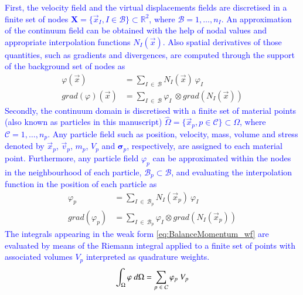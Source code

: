 \documentclass[preprint,12pt,a4paper]{elsarticle}
\newcommand{\tens}[1]{
  \ensuremath{\mathbf{{#1}}}
}
\newcommand\Grad[1]{grad({#1})}
\newcommand{\Integral}[2]{
  \IfStrEqCase{#1}{
    {2}{\ensuremath{\int_{\Gamma_d}{#2}\ d\Gamma}}
    {3}{\ensuremath{\int_{\Omega}{#2}\ d\Omega}}
  }
}
\begin{document}
\textcolor{blue}{First, the velocity field and the virtual displacements fields are discretised in a finite set of nodes $\textbf{X} = \{ \vec{x}_I, I \in \mathcal{B} \} \subset \mathbb{R}^{2}$, where $\mathcal{B} = 1, \ldots, n_I$. An approximation of the continuum field can be obtained with the help of nodal values and appropriate interpolation functions $N_I(\vec{x})$. Also spatial derivatives of those quantities, such as gradients and divergences, are computed through the support of the background set of nodes as}
\begin{align}
    \label{eq:variable_reconstruction}
    \varphi(\vec{x}) &= \sum_{I\ \in\ \mathcal{B}} N_I(\vec{x})\ \varphi_I \\
    \label{eq:grad_variable_reconstruction}
    \Grad{\varphi}(\vec{x}) &= \sum_{I\ \in\ \mathcal{B}} \varphi_I\ \otimes \Grad{N_I(\vec{x})}
\end{align}
\textcolor{blue}{Secondly, the continuum \gls{domain} is discretised with a finite set of material points (also known as particles in this manuscript) $\hat{\Omega} = \{ \vec{x}_p, p \in \mathcal{C} \} \subset \Omega$, where $\mathcal{C} = 1, \ldots, n_p$. Any particle field such as position, velocity, mass, volume and stress denoted by $\vec{x}_p$, $\vec{v}_p$, $m_p$, $V_p$ and $\tens{\sigma}_p$, respectively, are assigned to each material point. Furthermore, any particle field $\varphi_p$ can be approximated within the nodes in the neighbourhood of each particle, $\mathcal{B}_p \subset \mathcal{B}$, and evaluating the interpolation function in the position of each particle as}
\begin{align}
    \label{eq:particle_variable_reconstruction}
\varphi_p &= \sum_{I\ \in\ \mathcal{B}_p} N_I(\vec{x}_p)\ \varphi_I \\
\Grad{\varphi_p} &= \sum_{I\ \in\ \mathcal{B}_p} \varphi_I \otimes \Grad{N_I(\vec{x}_p)}
\end{align}
\textcolor{blue}{The integrals appearing in the weak form \eqref{eq:BalanceMomentum_wf} are evaluated by means of the Riemann integral \cite{Riemann_1854} applied to a finite set of points with associated volumes $V_p$ interpreted as quadrature weights.}
\begin{equation}
    \label{eq:particle_riemann_integral}
\Integral{3}{\varphi} = \sum_{p\ \in\ \mathcal{C}} \varphi_p\ V_p 
\end{equation}
\end{document}
